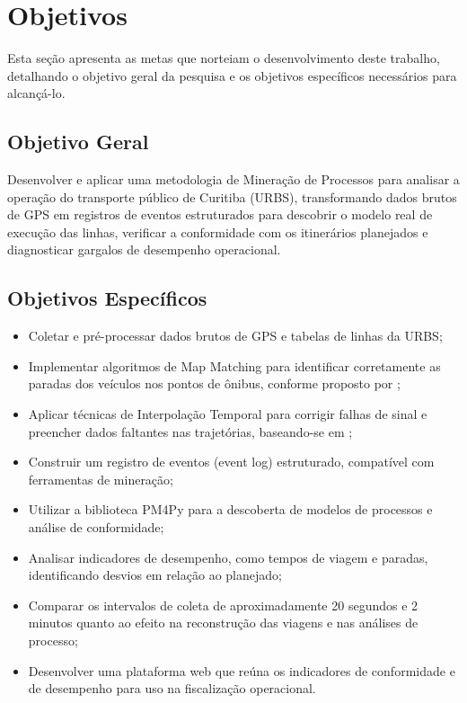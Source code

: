 \section{Objetivos}\label{sec:objetivos}

Esta seção apresenta as metas que norteiam o desenvolvimento deste trabalho, detalhando o objetivo geral da pesquisa e os objetivos específicos necessários para alcançá-lo.

\subsection{Objetivo Geral}\label{subsec:objetivoGeral}

Desenvolver e aplicar uma metodologia de Mineração de Processos para analisar a operação do transporte público de Curitiba (URBS), transformando dados brutos de GPS em registros de eventos estruturados para descobrir o modelo real de execução das linhas, verificar a conformidade com os itinerários planejados e diagnosticar gargalos de desempenho operacional.

\subsection{Objetivos Específicos}\label{subsec:objetivosEspecificos}

\begin{itemize}
  \item Coletar e pré-processar dados brutos de GPS e tabelas de linhas da URBS;
  \item Implementar algoritmos de Map Matching para identificar corretamente as paradas dos veículos nos pontos de ônibus, conforme proposto por ;
  \item Aplicar técnicas de Interpolação Temporal para corrigir falhas de sinal e preencher dados faltantes nas trajetórias, baseando-se em ;
  \item Construir um registro de eventos (event log) estruturado, compatível com ferramentas de mineração;
  \item Utilizar a biblioteca PM4Py \cite{berti2019} para a descoberta de modelos de processos e análise de conformidade;
  \item Analisar indicadores de desempenho, como tempos de viagem e paradas, identificando desvios em relação ao planejado;
  \item Comparar os intervalos de coleta de aproximadamente 20 segundos e 2 minutos quanto ao efeito na reconstrução das viagens e nas análises de processo;
  \item Desenvolver uma plataforma web que reúna os indicadores de conformidade e de desempenho para uso na fiscalização operacional.
\end{itemize}

